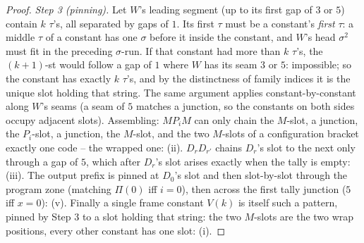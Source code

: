 \documentclass[runningheads,envcountsect]{llncs}
\begin{document}
\begin{proof}
    \emph{Step 3 (pinning).} Let $W$'s leading segment (up to its
    first gap of $3$ or $5$) contain $k$ $\tau$'s, all separated by
    gaps of $1$. Its first $\tau$ must be a constant's \emph{first}
    $\tau$: a middle $\tau$ of a constant has one $\sigma$ before it
    inside the constant, and $W$'s head $\sigma^2$ must fit in the
    preceding $\sigma$-run. If that constant had more than $k$ $\tau$'s,
    the $(k{+}1)$-st would follow a gap of $1$ where $W$ has its seam
    $3$ or $5$: impossible; so the constant has exactly $k$ $\tau$'s,
    and by the distinctness of family indices it is the unique slot
    holding that string. The same argument applies constant-by-constant
    along $W$'s seams (a seam of $5$ matches a junction, so the
    constants on both sides occupy adjacent slots). Assembling:
    $M P_i M$ can only chain the $M$-slot, a junction, the $P_i$-slot,
    a junction, the $M$-slot, and the two $M$-slots of a configuration
    bracket exactly one code -- the wrapped one: (ii). $D_r D_{r'}$
    chains $D_r$'s slot to the next only through a gap of $5$, which
    after $D_r$'s slot arises exactly when the tally is empty: (iii).
    The output prefix is pinned at $D_0$'s slot and then slot-by-slot
    through the program zone (matching $\Pi(0)$ iff $i = 0$), then
    across the first tally junction ($5$ iff $x = 0$): (v). Finally a
    single frame constant $V(k)$ is itself such a pattern, pinned by
    Step 3 to a slot holding that string: the two $M$-slots are the two
    wrap positions, every other constant has one slot: (i).
\end{proof}
\end{document}
